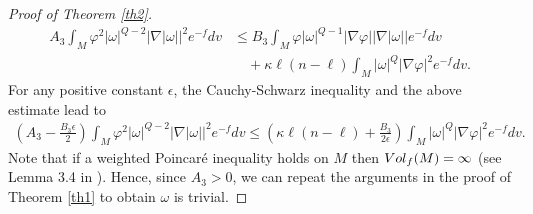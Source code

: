 \documentclass[10pt,a4paper]{amsart}
\numberwithin{equation}{section}
\begin{document}
\begin{proof}[Proof of Theorem \ref{th2}]
	\begin{align}\nonumber
		A_3 \int_M \varphi^2 |\omega|^{Q-2}|\nabla|\omega||^2 e^{-f}dv &\le B_3 \int_M \varphi |\omega|^{Q-1} |\nabla \varphi||\nabla|\omega||e^{-f}dv\\ \nonumber
		&\quad+\kappa \ell (n-\ell) \int_M |\omega|^Q |\nabla \varphi|^2 e^{-f}dv.
	\end{align}
	For any positive constant $\epsilon$, the Cauchy-Schwarz inequality and the above estimate lead to
	\begin{align} \nonumber
		\left(A_3-\frac{B_3 \epsilon}{2}\right) \int_M \varphi^2 |\omega|^{Q-2}|\nabla|\omega||^2 e^{-f}dv \le \left(\kappa \ell (n-\ell)+\frac{B_3 }{2\epsilon} \right) \int_M |\omega|^Q |\nabla \varphi|^2 e^{-f}dv.
	\end{align}
	Note that if a weighted Poincar\'e inequality holds on $M$ then $\rm{Vol}_f(M)=\infty$ (see Lemma 3.4 in \cite{DDH25}).  Hence, since $A_3>0$, we can repeat the arguments in the proof of Theorem \ref{th1} to obtain $\omega$ is trivial.
	

\end{proof}
\end{document}
